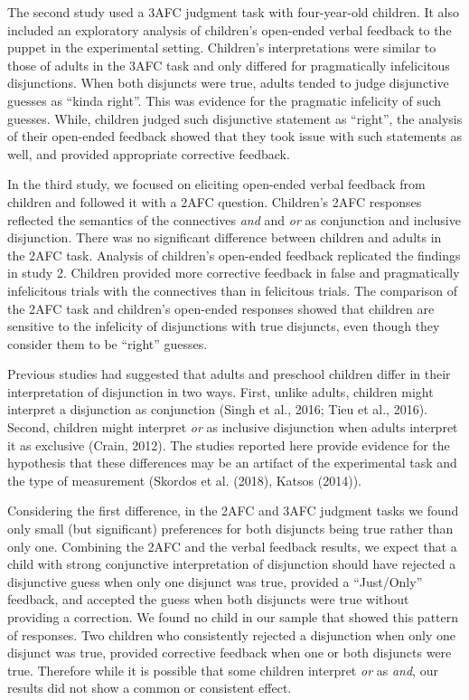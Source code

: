 \documentclass[floatsintext,man]{apa6}
\theoremstyle{definition}
\theoremstyle{definition}
\theoremstyle{definition}
\theoremstyle{remark}
\begin{document}
The second study used a 3AFC judgment task with four-year-old children.
It also included an exploratory analysis of children's open-ended verbal
feedback to the puppet in the experimental setting. Children's
interpretations were similar to those of adults in the 3AFC task and
only differed for pragmatically infelicitous disjunctions. When both
disjuncts were true, adults tended to judge disjunctive guesses as
\enquote{kinda right}. This was evidence for the pragmatic infelicity of
such guesses. While, children judged such disjunctive statement as
\enquote{right}, the analysis of their open-ended feedback showed that
they took issue with such statements as well, and provided appropriate
corrective feedback.

In the third study, we focused on eliciting open-ended verbal feedback
from children and followed it with a 2AFC question. Children's 2AFC
responses reflected the semantics of the connectives \emph{and} and
\emph{or} as conjunction and inclusive disjunction. There was no
significant difference between children and adults in the 2AFC task.
Analysis of children's open-ended feedback replicated the findings in
study 2. Children provided more corrective feedback in false and
pragmatically infelicitous trials with the connectives than in
felicitous trials. The comparison of the 2AFC task and children's
open-ended responses showed that children are sensitive to the
infelicity of disjunctions with true disjuncts, even though they
consider them to be \enquote{right} guesses.

Previous studies had suggested that adults and preschool children differ
in their interpretation of disjunction in two ways. First, unlike
adults, children might interpret a disjunction as conjunction (Singh et
al., 2016; Tieu et al., 2016). Second, children might interpret
\emph{or} as inclusive disjunction when adults interpret it as exclusive
(Crain, 2012). The studies reported here provide evidence for the
hypothesis that these differences may be an artifact of the experimental
task and the type of measurement (Skordos et al. (2018), Katsos (2014)).

Considering the first difference, in the 2AFC and 3AFC judgment tasks we
found only small (but significant) preferences for both disjuncts being
true rather than only one. Combining the 2AFC and the verbal feedback
results, we expect that a child with strong conjunctive interpretation
of disjunction should have rejected a disjunctive guess when only one
disjunct was true, provided a \enquote{Just/Only} feedback, and accepted
the guess when both disjuncts were true without providing a correction.
We found no child in our sample that showed this pattern of responses.
Two children who consistently rejected a disjunction when only one
disjunct was true, provided corrective feedback when one or both
disjuncts were true. Therefore while it is possible that some children
interpret \emph{or} as \emph{and}, our results did not show a common or
consistent effect.
\end{document}
